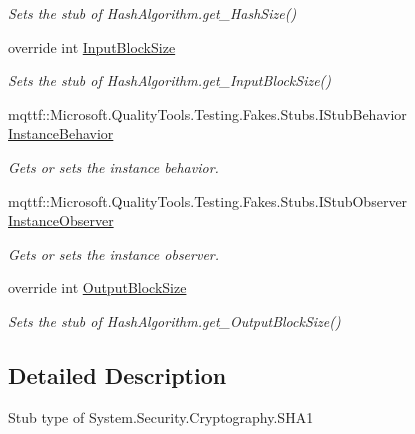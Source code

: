 \begin{DoxyCompactItemize}
\begin{DoxyCompactList}\small\item\em Sets the stub of Hash\-Algorithm.\-get\-\_\-\-Hash\-Size()\end{DoxyCompactList}\item 
override int \hyperlink{class_system_1_1_security_1_1_cryptography_1_1_fakes_1_1_stub_s_h_a1_ab90ef03156e0a1ec3946e488c1880143}{Input\-Block\-Size}
\begin{DoxyCompactList}\small\item\em Sets the stub of Hash\-Algorithm.\-get\-\_\-\-Input\-Block\-Size()\end{DoxyCompactList}\item 
mqttf\-::\-Microsoft.\-Quality\-Tools.\-Testing.\-Fakes.\-Stubs.\-I\-Stub\-Behavior \hyperlink{class_system_1_1_security_1_1_cryptography_1_1_fakes_1_1_stub_s_h_a1_a0b8d83e879076b4f457b8bdf80dd5d67}{Instance\-Behavior}
\begin{DoxyCompactList}\small\item\em Gets or sets the instance behavior.\end{DoxyCompactList}\item 
mqttf\-::\-Microsoft.\-Quality\-Tools.\-Testing.\-Fakes.\-Stubs.\-I\-Stub\-Observer \hyperlink{class_system_1_1_security_1_1_cryptography_1_1_fakes_1_1_stub_s_h_a1_a86fe0dfcf4365a993f78b9d2e08ce7b4}{Instance\-Observer}
\begin{DoxyCompactList}\small\item\em Gets or sets the instance observer.\end{DoxyCompactList}\item 
override int \hyperlink{class_system_1_1_security_1_1_cryptography_1_1_fakes_1_1_stub_s_h_a1_a8833400a99719751f6b8841173c7b070}{Output\-Block\-Size}
\begin{DoxyCompactList}\small\item\em Sets the stub of Hash\-Algorithm.\-get\-\_\-\-Output\-Block\-Size()\end{DoxyCompactList}\end{DoxyCompactItemize}


\subsection{Detailed Description}
Stub type of System.\-Security.\-Cryptography.\-S\-H\-A1




